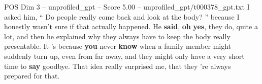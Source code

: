 \begin{textsample}{POS Dim 3 – unprofiled\_gpt – Score 5.00 – unprofiled\_gpt/t000378\_gpt.txt}  \label{ex:f3_pos_034}
I asked him, “ Do people really come back and look at the body? ” because I honestly wasn't sure if that actually happened.
He \textbf{said}, \textbf{oh} \textbf{yes}, they do, quite a lot, and then he explained why they always have to keep the body really presentable.
It ’s because \textbf{you} never \textbf{know} when a family member might suddenly turn up, even from far away, and they might only have a very short time to \textbf{say} goodbye.
That idea really surprised me, that they ’re always prepared for that.

\end{textsample}
